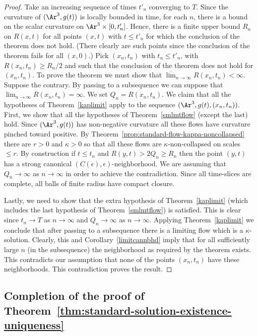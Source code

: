 \begin{proof}
 Take an increasing sequence of times $t'_n$ converging to $T$.
Since the curvature of $(\Ar^3,g(t))$ is locally bounded in time,
for each $n$, there is a bound on the scalar curvature on
$\Ar^3\times [0,t'_n]$. Hence, there is a finite upper bound $R_n$
on $R(x,t)$ for all points $(x,t)$ with $t\le t'_n$ for which the
conclusion of the theorem does not hold. (There clearly are such
points since the conclusion of the theorem fails for all $(x,0)$.)
Pick $(x_n,t_n)$ with $t_n\le t'_n$, with $R(x_n,t_n)\ge R_n/2$ and
such that the conclusion of the theorem does not hold for
$(x_n,t_n)$. To prove the theorem we must show that $\overline\lim_{n\rightarrow\infty}R(x_n,t_n)<\infty$. Suppose the contrary.
By passing to a subsequence we can suppose that $\lim_{n\rightarrow \infty}R(x_n,t_n)=\infty$. We set
$Q_n=R(x_n,t_n)$. We claim that all the hypotheses of
Theorem~\ref{kaplimit} apply to the sequence
$(\Ar^3,g(t),(x_n,t_n))$. First, we show that all the hypotheses of
Theorem~\ref{smlmtflow} (except the last) hold. Since $(\Ar^3,g(t))$
has non-negative curvature all these flows have curvature pinched
toward positive. By Theorem~\ref{prop:standard-flow-kappa-noncollapsed} there are $r>0$ and
$\kappa>0$ so that all these flows are $\kappa$-non-collapsed on
scales $\le r$. By construction if $t\le t_n$ and $R(y,t)>2Q_n\ge
R_n$ then  the point $(y,t)$ has a strong canonical
$(C(\epsilon),\epsilon)$-neighborhood. We are assuming that
$Q_n\rightarrow \infty$ as $n\rightarrow \infty$ in order to achieve
the contradiction. Since all time-slices are complete, all balls of
finite radius have compact closure.

Lastly, we need to show that the extra hypothesis of
Theorem~\ref{kaplimit} (which includes the last hypothesis of
Theorem~\ref{smlmtflow}) is satisfied. This is clear since
$t_n\rightarrow T$ as $n\rightarrow \infty$ and $Q_n\rightarrow
\infty$ as $n\rightarrow \infty$. Applying Theorem~\ref{kaplimit} we
conclude that after passing to a subsequence there is a limiting
flow which is a $\kappa$-solution. Clearly, this and
Corollary~\ref{limitcannbhd} imply that for all sufficiently large
$n$ (in the subsequence)  the neighborhood as required by the
theorem exists. This contradicts our assumption that none of the
points $(x_n,t_n)$ have these neighborhoods. This contradiction
proves the result.
\end{proof}

\subsection{Completion of the proof of
Theorem~{\ref{thm:standard-solution-existence-uniqueness}}}

